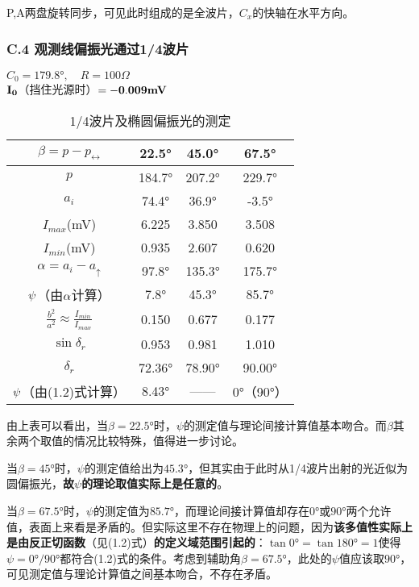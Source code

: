 \documentclass{ctexart}
\begin{document}
\noindent P,A两盘旋转同步，可见此时组成的是全波片，$C_x$的快轴在水平方向。
\subsubsection*{C.4 \quad 观测线偏振光通过1/4波片}
\noindent $C_0=179.8°, \quad R=100\Omega$\\
\noindent $\bf{I_0}$（挡住光源时）$\bf{=-0.009mV}$
\begin{table}[!htbp]
  \centering
  \caption{1/4波片及椭圆偏振光的测定}\vspace{0.3em} \label{tab:aStrangeTable}%
  \resizebox{0.417\linewidth}{!}
  {
  \begin{tabular}{c|ccc}
  \toprule
  $\beta=p-p_{\leftrightarrow}$& 22.5°& 45.0°& 67.5° \\
  \midrule
  $p$& 184.7°& 207.2°& 229.7°\\
  $a_i$& 74.4° &36.9° &-3.5°\\
  $I_{max}$(mV)& 6.225& 3.850& 3.508\\
  $I_{min}$(mV)& 0.935& 2.607& 0.620\\
  $\alpha=a_i-a_{\uparrow}$& 97.8°& 135.3°& 175.7°\\
  $\bf{\psi}$（由$\bf{\alpha}$计算）& 7.8°& 45.3°& 85.7°\\
  $\frac{b^2}{a^2}\approx \frac{I_{min}}{I_{max}}$& 0.150& 0.677& 0.177\\
  $\sin{\delta_r}$& 0.953& 0.981& 1.010\\
  $\delta_r$& 72.36°& 78.90°& 90.00°\\
  $\bf{\psi}$（由(1.2)式计算）& 8.43° & ——& 0°（90°） \\
  \bottomrule
  \end{tabular}
  }
  \end{table}
\clearpage
由上表可以看出，当$\beta=22.5°$时，$\psi$的测定值与理论间接计算值基本吻合。而$\beta$其余两个取值的情况比较特殊，值得进一步讨论。

当$\beta=45°$时，$\psi$的测定值给出为$45.3°$，但其实由于此时从1/4波片出射的光近似为圆偏振光，\textbf{故$\psi$的理论取值实际上是任意的}。

当$\beta=67.5°$时，$\psi$的测定值为$85.7°$，而理论间接计算值却存在$0°$或$90°$两个允许值，表面上来看是矛盾的。但实际这里不存在物理上的问题，因为\textbf{该多值性实际上是由反正切函数}（见(1.2)式）\textbf{的定义域范围引起的}：$\tan{0°}=\tan{180°}=1$使得$\psi=0°/90°$都符合(1.2)式的条件。考虑到辅助角$\beta=67.5°$，此处的$\psi$值应该取$90°$，可见测定值与理论计算值之间基本吻合，不存在矛盾。
\end{document}
